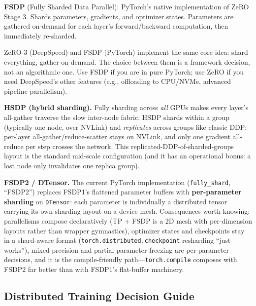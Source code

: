\textbf{FSDP} (Fully Sharded Data Parallel): PyTorch's native implementation of ZeRO Stage 3. Shards parameters, gradients, and optimizer states. Parameters are gathered on-demand for each layer's forward/backward computation, then immediately re-sharded.

\begin{keyinsight}
ZeRO-3 (DeepSpeed) and FSDP (PyTorch) implement the same core idea: shard everything, gather on demand. The choice between them is a framework decision, not an algorithmic one. Use FSDP if you are in pure PyTorch; use ZeRO if you need DeepSpeed's other features (e.g., offloading to CPU/NVMe, advanced pipeline parallelism).
\end{keyinsight}

\textbf{HSDP (hybrid sharding).} Fully sharding across \emph{all} GPUs makes every layer's all-gather traverse the slow inter-node fabric. HSDP shards within a group (typically one node, over NVLink) and \emph{replicates} across groups like classic DDP: per-layer all-gather/reduce-scatter stays on NVLink, and only one gradient all-reduce per step crosses the network. This replicated-DDP-of-sharded-groups layout is the standard mid-scale configuration (and it has an operational bonus: a lost node only invalidates one replica group).

\textbf{FSDP2 / DTensor.} The current PyTorch implementation (\texttt{fully\_shard}, ``FSDP2'') replaces FSDP1's flattened parameter buffers with \textbf{per-parameter sharding} on \texttt{DTensor}: each parameter is individually a distributed tensor carrying its own sharding layout on a device mesh. Consequences worth knowing: parallelisms compose declaratively (TP + FSDP is a 2D mesh with per-dimension layouts rather than wrapper gymnastics), optimizer states and checkpoints stay in a shard-aware format (\texttt{torch.distributed.checkpoint} resharding ``just works''), mixed-precision and partial-parameter freezing are per-parameter decisions, and it is the compile-friendly path---\texttt{torch.compile} composes with FSDP2 far better than with FSDP1's flat-buffer machinery.

\subsection{Distributed Training Decision Guide}

